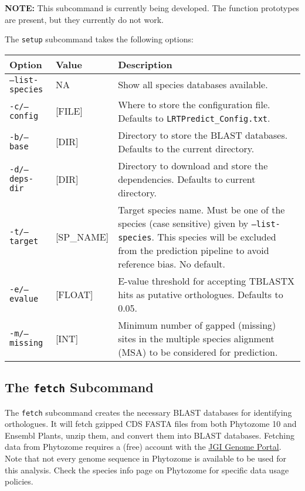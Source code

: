 \documentclass[12pt]{article}
\begin{document}
\par \textbf{NOTE:} This subcommand is currently being developed. The function
prototypes are present, but they currently do not work.
\par The \texttt{setup} subcommand takes the following options:
\begin{table}[H]
    \centering
    \begin{tabular}{p{105pt} l p{260pt}}
    \toprule
    Option & Value & Description \\
    \midrule
    \texttt{--list-species} & NA & Show all species databases available. \\
    \midrule
    \texttt{-c/--config} & [FILE] & Where to store the configuration file. Defaults to \texttt{LRTPredict\_Config.txt}. \\
    \midrule
    \texttt{-b/--base} & [DIR] & Directory to store the BLAST databases. Defaults to the current directory.\\
    \midrule
    \texttt{-d/--deps-dir} & [DIR] & Directory to download and store the dependencies. Defaults to current directory.\\
    \midrule
    \texttt{-t/--target} & [SP\_NAME] & Target species name. Must be one of the species (case sensitive) given by \texttt{--list-species}. This species will be excluded from the prediction pipeline to avoid reference bias. No default.\\
    \midrule
    \texttt{-e/--evalue} & [FLOAT] & E-value threshold for accepting TBLASTX hits as putative orthologues. Defaults to 0.05.\\
    \midrule
    \texttt{-m/--missing} & [INT] & Minimum number of gapped (missing) sites in the multiple species alignment (MSA) to be considered for prediction.\\
    \bottomrule
    \end{tabular}
\end{table}

\subsection*{The \texttt{fetch} Subcommand}
\par The \texttt{fetch} subcommand creates the necessary BLAST databases for
identifying orthologues. It will fetch gzipped CDS FASTA files from both
Phytozome 10 and Ensembl Plants, unzip them, and convert them into BLAST
databases. Fetching data from Phytozome requires a (free) account with
the \href{http://genome.jgi.doe.gov/}{JGI Genome Portal}. Note that not every
genome sequence in Phytozome is available to be used for this analysis. Check
the species info page on Phytozome for specific data usage policies.
\end{document}
